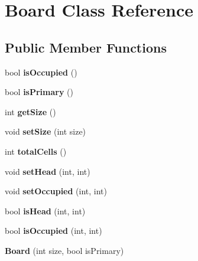 \hypertarget{classBoard}{}\section{Board Class Reference}
\label{classBoard}
\subsection*{Public Member Functions}
\begin{DoxyCompactItemize}
\item 
bool {\bfseries is\+Occupied} ()\hypertarget{classBoard_a81a02ad38ac196b01247dee0405dacad}{}\label{classBoard_a81a02ad38ac196b01247dee0405dacad}

\item 
bool {\bfseries is\+Primary} ()\hypertarget{classBoard_abda639fefd04286773bf2f99e57f3437}{}\label{classBoard_abda639fefd04286773bf2f99e57f3437}

\item 
int {\bfseries get\+Size} ()\hypertarget{classBoard_af093d8ac43989ad95dc03c714335b8e5}{}\label{classBoard_af093d8ac43989ad95dc03c714335b8e5}

\item 
void {\bfseries set\+Size} (int size)\hypertarget{classBoard_a3bed92eb3da5c865cf591292631c9353}{}\label{classBoard_a3bed92eb3da5c865cf591292631c9353}

\item 
int {\bfseries total\+Cells} ()\hypertarget{classBoard_af0ae9fa40ac726469140bab4f051a790}{}\label{classBoard_af0ae9fa40ac726469140bab4f051a790}

\item 
void {\bfseries set\+Head} (int, int)\hypertarget{classBoard_a730a16434b08168d0d927dc56331d473}{}\label{classBoard_a730a16434b08168d0d927dc56331d473}

\item 
void {\bfseries set\+Occupied} (int, int)\hypertarget{classBoard_aa3cb6d8c9451c37597f69b3c37453994}{}\label{classBoard_aa3cb6d8c9451c37597f69b3c37453994}

\item 
bool {\bfseries is\+Head} (int, int)\hypertarget{classBoard_acc1408df43b2b1d616fb3d2b84667336}{}\label{classBoard_acc1408df43b2b1d616fb3d2b84667336}

\item 
bool {\bfseries is\+Occupied} (int, int)\hypertarget{classBoard_ad1a7a95b25a3725fdc36b7f18afd1e22}{}\label{classBoard_ad1a7a95b25a3725fdc36b7f18afd1e22}

\item 
{\bfseries Board} (int size, bool is\+Primary)\hypertarget{classBoard_a13cc3e8fad90e23e2826edcc690c2ce1}{}\label{classBoard_a13cc3e8fad90e23e2826edcc690c2ce1}

\end{DoxyCompactItemize}
